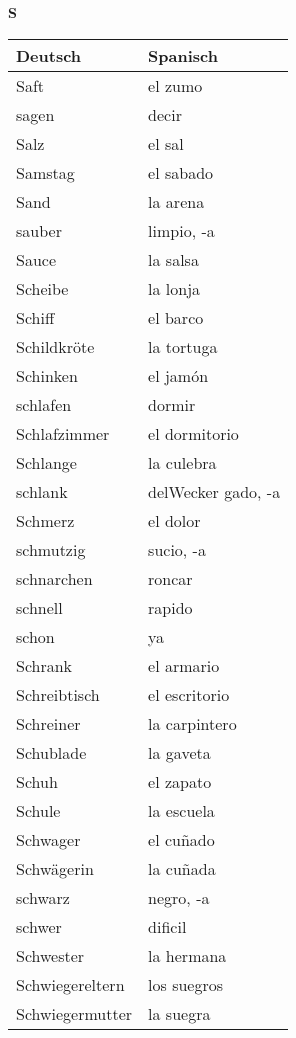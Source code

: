 \begin{flushright}\begin{Huge}\textbf{S}\end{Huge}\end{flushright}

\begin{longtable}{p{} p{}} 
\textbf{Deutsch}     & \textbf{Spanisch}                                       \\ \hline
\hline
\endhead %
Saft & el zumo\\
sagen & decir \\
Salz & el sal\\
Samstag & el sabado\\
Sand & la arena\\
sauber & limpio, -a\\
Sauce & la salsa\\
Scheibe & la lonja\\
Schiff & el barco\\
Schildkröte & la tortuga\\
Schinken & el jamón\\
schlafen & dormir\\
Schlafzimmer & el dormitorio\\
Schlange & la culebra\\
schlank & delWecker
gado, -a\\
Schmerz & el dolor\\
schmutzig & sucio, -a\\
schnarchen & roncar\\
schnell & rapido\\
schon & ya\\
Schrank & el armario\\
Schreibtisch & el escritorio\\
Schreiner & la carpintero\\
Schublade & la gaveta\\
Schuh & el zapato\\
Schule & la escuela\\
Schwager & el cuñado\\
Schwägerin & la cuñada\\
schwarz & negro, -a\\
schwer & dificil\\
Schwester & la hermana\\
Schwiegereltern & los suegros\\
Schwiegermutter & la suegra\\

\end{longtable}

